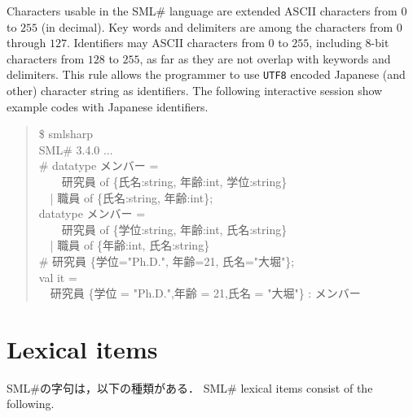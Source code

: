 \documentclass{jbook}
\newcommand{\txt}[2]{#2}
\newcommand{\smlsharp}{SML\#}
\newcommand{\version}{3.4.0}
\newcommand{\code}[1]{\mbox{\large\tt #1}}
\newcommand{\myem}{\mbox{\ \ }}
\newenvironment{program}{\begin{quote}\begin{tt}}%
                        {\end{tt}\end{quote}}
\begin{document}
\else%
	Characters usable in the \smlsharp{} language are extended 
ASCII characters from $0$ to $255$ (in decimal).
	Key words and delimiters are among the characters from 
$0$ through $127$.
	Identifiers may ASCII characters from $0$ to $255$, including
8-bit characters from $128$ to $255$, as far as they are not overlap with 
keywords and delimiters.
	This rule allows the programmer to use \code{UTF8} encoded
Japanese (and other) character string as identifiers.
	The following interactive session show example codes with
Japanese identifiers.
\begin{program}
  \$ smlsharp\\
  SML\# \version{} ...\\
  \# datatype メンバー = 
\\
   \myem\myem  研究員 of \{氏名:string, 年齢:int, 学位:string\} 
\\
   \myem | 職員 of \{氏名:string, 年齢:int\};
\\
  datatype メンバー =
\\
   \myem\myem 研究員 of \{学位:string, 年齢:int, 氏名:string\}
\\
  \myem | 職員 of \{年齢:int, 氏名:string\}
\\
  \# 研究員 \{学位="Ph.D.", 年齢=21, 氏名="大堀"\};
\\
  val it =
\\
  \myem 研究員 \{学位 = "Ph.D.",年齢 = 21,氏名 = "大堀"\} : メンバー
\end{program}
\fi%

\section{\txt{字句集合}{Lexical items}}
\label{sec:reference:lexicalitems}
\ifjp%
	\smlsharp{}の字句は，以下の種類がある．
\else%
	\smlsharp{} lexical items consist of the following.
\fi%
\end{document}
